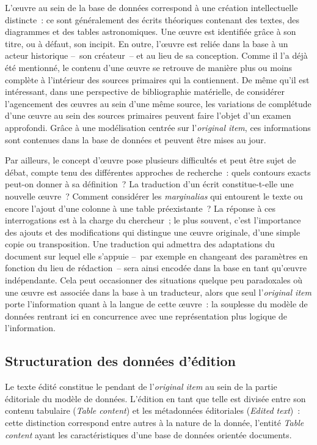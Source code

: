 \documentclass[a4paper,12pt,twoside]{book}
\newcommand{\eng}{\emph}
\newcommand{\oi}{\eng{original item}\xspace}
\begin{document}
L'œuvre au sein de la base de données correspond à une création intellectuelle distincte~: ce sont généralement des écrits théoriques contenant des textes, des diagrammes et des tables astronomiques. Une œuvre est identifiée grâce à son titre, ou à défaut, son incipit. En outre, l'œuvre est reliée dans la base à un acteur historique –~son créateur~– et au lieu de sa conception. Comme il l'a déjà été mentionné, le contenu d'une œuvre se retrouve de manière plus ou moins complète à l'intérieur des sources primaires qui la contiennent. De même qu'il est intéressant, dans une perspective de bibliographie matérielle, de considérer l'agencement des œuvres au sein d'une même source, les variations de complétude d'une œuvre au sein des sources primaires peuvent faire l'objet d'un examen approfondi. Grâce à une modélisation centrée sur l'\oi, ces informations sont contenues dans la base de données et peuvent être mises au jour.

Par ailleurs, le concept d'œuvre pose plusieurs difficultés et peut être sujet de débat, compte tenu des différentes approches de recherche~: quels contours exacts peut-on donner à sa définition~? La traduction d'un écrit constitue-t-elle une nouvelle œuvre~? Comment considérer les \eng{marginalias} qui entourent le texte ou encore l'ajout d'une colonne à une table préexistante~? La réponse à ces interrogations est à la charge du chercheur~; le plus souvent, c'est l'importance des ajouts et des modifications qui distingue une œuvre originale, d'une simple copie ou transposition. Une traduction qui admettra des adaptations du document sur lequel elle s'appuie –~par exemple en changeant des paramètres en fonction du lieu de rédaction~– sera ainsi encodée dans la base en tant qu'œuvre indépendante. Cela peut occasionner des situations quelque peu paradoxales où une œuvre est associée dans la base à un traducteur, alors que seul l'\oi porte l'information quant à la langue de cette œuvre~: la souplesse du modèle de données rentrant ici en concurrence avec une représentation plus logique de l'information.

		\subsection{Structuration des données d'édition}
Le texte édité constitue le pendant de l'\oi au sein de la partie éditoriale du modèle de données. L'édition en tant que telle est divisée entre son contenu tabulaire (\eng{Table content}) et les métadonnées éditoriales (\eng{Edited text})~: cette distinction correspond entre autres à la nature de la donnée, l'entité \eng{Table content} ayant les caractéristiques d'une base de données orientée documents.
\end{document}
